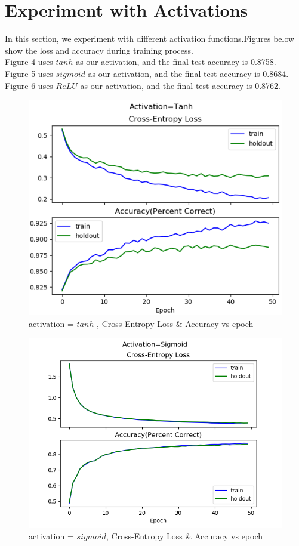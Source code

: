 \documentclass{article} %
\begin{document}
\section{Experiment with Activations}
In this section, we experiment with different activation functions.Figures below show the loss and accuracy during training process.\\
Figure 4 uses $tanh$ as our activation, and the final test accuracy is 0.8758. \\
Figure 5 uses  $sigmoid$ as our activation, and the final test accuracy is 0.8684. \\
Figure 6 uses  $ReLU$ as our activation, and the final test accuracy is 0.8762. \\
\begin{figure}[h]	
	\centering
	\includegraphics[scale=0.5]{./plots/TanhActivation.png}
	\caption{activation = $tanh$ , Cross-Entropy Loss \& Accuracy vs epoch}
\end{figure}
\begin{figure}[h]	
	\centering
	\includegraphics[scale=0.5]{./plots/SigmoidActivation.png}
	\caption{activation = $sigmoid$, Cross-Entropy Loss \& Accuracy vs epoch}
\end{figure}
\end{document}
